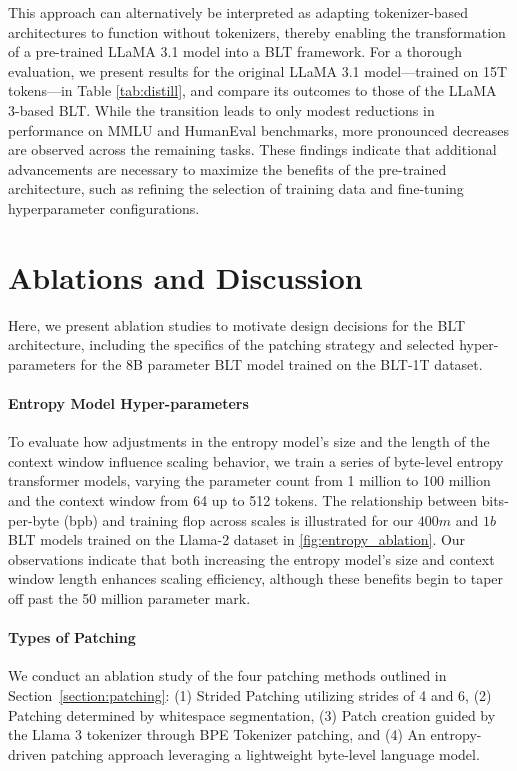This approach can alternatively be interpreted as adapting tokenizer-based architectures to function without tokenizers, thereby enabling the transformation of a pre-trained LLaMA 3.1 model into a {\textsc BLT} framework. For a thorough evaluation, we present results for the original LLaMA 3.1 model—trained on 15T tokens—in Table \ref{tab:distill}, and compare its outcomes to those of the LLaMA 3-based {\textsc BLT}. While the transition leads to only modest reductions in performance on MMLU and HumanEval benchmarks, more pronounced decreases are observed across the remaining tasks. These findings indicate that additional advancements are necessary to maximize the benefits of the pre-trained architecture, such as refining the selection of training data and fine-tuning hyperparameter configurations.

\section{Ablations and Discussion}
\label{section:ablations}
Here, we present ablation studies to motivate design decisions for the {\textsc BLT} architecture, including the specifics of the patching strategy and selected hyper-parameters for the 8B parameter {\textsc BLT} model trained on the {\textsc BLT}-1T dataset.

\paragraph{Entropy Model Hyper-parameters} To evaluate how adjustments in the entropy model's size and the length of the context window influence scaling behavior, we train a series of byte-level entropy transformer models, varying the parameter count from 1 million to 100 million and the context window from 64 up to 512 tokens. The relationship between bits-per-byte (bpb) and training flop across scales is illustrated for our $400m$ and $1b$ {\textsc BLT} models trained on the Llama-2 dataset in \autoref{fig:entropy_ablation}. Our observations indicate that both increasing the entropy model's size and context window length enhances scaling efficiency, although these benefits begin to taper off past the 50 million parameter mark.

\paragraph{Types of Patching}

We conduct an ablation study of the four patching methods outlined in Section~\ref{section:patching}: (1) Strided Patching utilizing strides of 4 and 6, (2) Patching determined by whitespace segmentation, (3) Patch creation guided by the Llama 3 tokenizer through BPE Tokenizer patching, and (4) An entropy-driven patching approach leveraging a lightweight byte-level language model.

